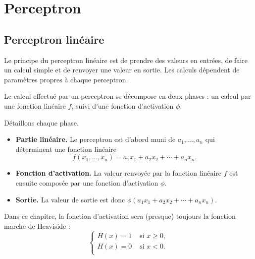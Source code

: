 \section{Perceptron}

\subsection{Perceptron linéaire}


Le principe du perceptron linéaire est de prendre des valeurs en entrées, de faire un calcul simple et de renvoyer une valeur en sortie. Les calculs dépendent de paramètres propres à chaque perceptron.




Le calcul effectué par un perceptron se décompose en deux phases : un calcul par une fonction linéaire $f$, suivi d'une fonction d'activation $\phi$.



Détaillons chaque phase.
\begin{itemize}
	\item \textbf{Partie linéaire.} Le perceptron est d'abord muni de   $a_1,\ldots,a_n$
	qui déterminent une fonction linéaire 
	$$f(x_1,\ldots,x_n) = a_1 x_1 + a_2 x_2 + \cdots + a_n x_n.$$
	\item \textbf{Fonction d'activation.} La valeur renvoyée par la fonction linéaire $f$ est ensuite composée par une fonction d'activation $\phi$.
	
	\item \textbf{Sortie.} La valeur de sortie est donc $\phi(a_1 x_1 + a_2 x_2 + \cdots + a_n x_n)$.
\end{itemize}

Dans ce chapitre, la fonction d'activation sera (presque) toujours la fonction marche de Heaviside :
$$\begin{cases}
	H(x) = 1 & \text{ si } x \ge 0, \\
	H(x) = 0  & \text{ si } x < 0. \\
\end{cases}$$





